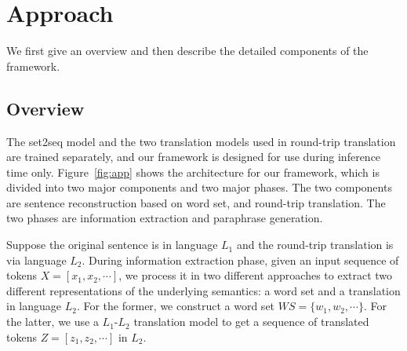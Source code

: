 \section{Approach}
We first give an overview and
then describe the detailed components of the framework.

\subsection{Overview} \label{sec:overview}


The set2seq model and the two translation models used in round-trip translation 
are trained separately, and our framework is designed for use during
inference time only. Figure~\ref{fig:app} shows the architecture for 
our framework, which is divided into two major components and two major phases. The two components are sentence reconstruction based on word set, 
and round-trip translation. The two phases are 
information extraction and paraphrase generation.


Suppose the original sentence is in language $L_1$ and the round-trip translation
is via language $L_2$. During information extraction phase, given an input 
sequence of tokens $X = [x_1, x_2, \cdots]$, we process it in two different 
approaches to extract two different representations of the underlying semantics: a word set and a translation in language $L_2$. For the former, we 
construct a word set $WS = \{w_1, w_2,\cdots\}$. For the latter, we use a $L_1$-$L_2$ translation model to get a sequence of translated tokens 
$Z = [z_1, z_2, \cdots]$ in $L_2$. 

